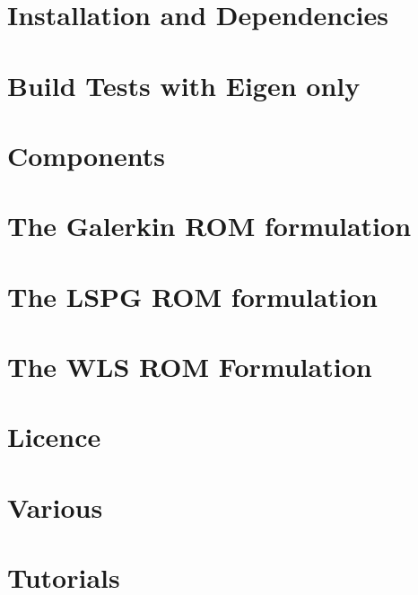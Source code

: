\let\mypdfximage\pdfximage\def\pdfximage{\immediate\mypdfximage}\documentclass[twoside]{book}
\newcommand{\+}{\discretionary{\mbox{\scriptsize$\hookleftarrow$}}{}{}}
\newcommand{\clearemptydoublepage}{%
  \newpage{\pagestyle{empty}\cleardoublepage}%
}
\begin{document}
\chapter{Installation and Dependencies}
\label{md_pages_old_getstarted_build_and_install}

\chapter{Build Tests with Eigen only}
\label{md_pages_old_getstarted_build_tests_eigen}

\chapter{Components}
\label{md_pages_old_getstarted_packages}

\chapter{The Galerkin ROM formulation}
\label{md_pages_old_various_formulation_galerkin}

\chapter{The LSPG ROM formulation}
\label{md_pages_old_various_formulation_lspg}

\chapter{The WLS ROM Formulation}
\label{md_pages_old_various_formulation_wls}

\chapter{Licence}
\label{md_pages_old_various_license}

\chapter{Various}
\label{md_pages_old_various}

\chapter{Tutorials}
\label{md_pages_tutorials}


\backmatter
\newpage
{}
\clearemptydoublepage
{}
\printindex
\end{document}
